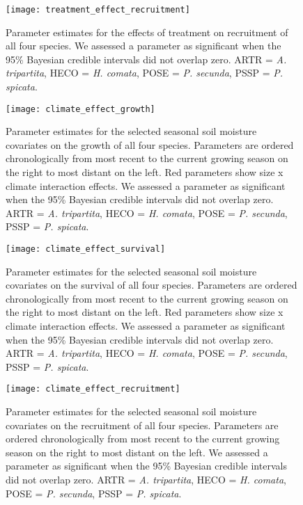 \documentclass[11pt]{article}
\begin{document}
\begin{figure}[!htbp]
	\centering
	\texttt{[image: treatment\_effect\_recruitment]}
	\caption{Parameter estimates for the effects of treatment on recruitment of all four species. We assessed a parameter as significant when the 95\% Bayesian credible intervals did not overlap zero.  ARTR = \textit{A. tripartita}, HECO = \textit{H. comata}, POSE = \textit{P. secunda}, PSSP = \textit{P. spicata}. }
	\label{fig:recruitmentTreat}
\end{figure}

\begin{figure}[!htbp]
	\centering
	\texttt{[image: climate\_effect\_growth]}
	\caption{Parameter estimates for the selected seasonal soil moisture covariates on the growth of all four species. Parameters are ordered chronologically from most recent to the current growing season on the right to most distant on the left. Red parameters show size x climate interaction effects. We assessed a parameter as significant when the 95\% Bayesian credible intervals did not overlap zero.  ARTR = \textit{A. tripartita}, HECO = \textit{H. comata}, POSE = \textit{P. secunda}, PSSP = \textit{P. spicata}. }
	\label{fig:climateGrowth}
\end{figure}

\begin{figure}[!htbp]
	\centering
	\texttt{[image: climate\_effect\_survival]}
	\caption{Parameter estimates for the selected seasonal soil moisture covariates on the survival of all four species. Parameters are ordered chronologically from most recent to the current growing season on the right to most distant on the left. Red parameters show size x climate interaction effects. We assessed a parameter as significant when the 95\% Bayesian credible intervals did not overlap zero.  ARTR = \textit{A. tripartita}, HECO = \textit{H. comata}, POSE = \textit{P. secunda}, PSSP = \textit{P. spicata}. }
	\label{fig:climateSurvival}
\end{figure}


\begin{figure}[!htbp]
	\centering
	\texttt{[image: climate\_effect\_recruitment]}
	\caption{Parameter estimates for the selected seasonal soil moisture covariates on the recruitment of all four species. Parameters are ordered chronologically from most recent to the current growing season on the right to most distant on the left. We assessed a parameter as significant when the 95\% Bayesian credible intervals did not overlap zero.  ARTR = \textit{A. tripartita}, HECO = \textit{H. comata}, POSE = \textit{P. secunda}, PSSP = \textit{P. spicata}. }
	\label{fig:climateRecruitment}
\end{figure}
\end{document}
